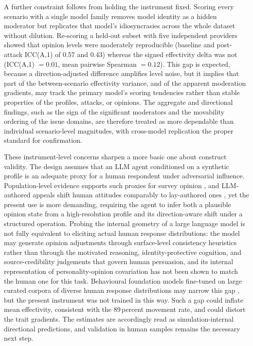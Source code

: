 \documentclass[11pt,a4paper]{article}
\begin{document}
A further constraint follows from holding the instrument fixed. Scoring every scenario with a
single model family removes model identity as a hidden moderator but replicates that model's
idiosyncrasies across the whole dataset without dilution. Re-scoring a held-out subset with five
independent providers showed that opinion levels were moderately reproducible (baseline and
post-attack ICC(A,1) of 0.57 and 0.43) whereas the signed effectivity delta was not
(ICC(A,1) $= 0.01$, mean pairwise Spearman $= 0.12$). This gap is expected, because a
direction-adjusted difference amplifies level noise, but it implies that part of the
between-scenario effectivity variance, and of the apparent moderation gradients, may track the
primary model's scoring tendencies rather than stable properties of the profiles, attacks, or
opinions. The aggregate and directional findings, such as the sign of the significant
moderators and the movability ordering of the issue domains, are therefore treated as more
dependable than individual scenario-level magnitudes, with cross-model replication the proper
standard for confirmation.

These instrument-level concerns sharpen a more basic one about construct validity. The design
assumes that an LLM agent conditioned on a synthetic profile is an adequate proxy for a human
respondent under adversarial influence. Population-level evidence supports such proxies for
survey opinion \citep{argyle2023out}, and LLM-authored appeals shift human attitudes comparably
to lay-authored ones \citep{bai2025llm}, yet the present use is more demanding, requiring the
agent to infer both a plausible opinion state from a high-resolution profile and its
direction-aware shift under a structured operation. Probing the internal geometry of a large
language model is not fully equivalent to eliciting actual human response distributions:
the model may generate opinion adjustments through surface-level consistency heuristics rather
than through the motivated reasoning, identity-protective cognition, and source-credibility
judgements that govern human persuasion, and its internal representation of
personality-opinion covariation has not been shown to match the human one for this task.
Behavioural foundation models fine-tuned on large curated corpora of diverse human response
distributions may narrow this gap \citep{zhou2026odyssim}, but the present instrument was not
trained in this way. Such a gap could inflate mean effectivity, consistent with the
89\,percent movement rate, and could distort the trait gradients. The estimates are accordingly
read as simulation-internal directional predictions, and validation in human samples remains
the necessary next step.
\end{document}

